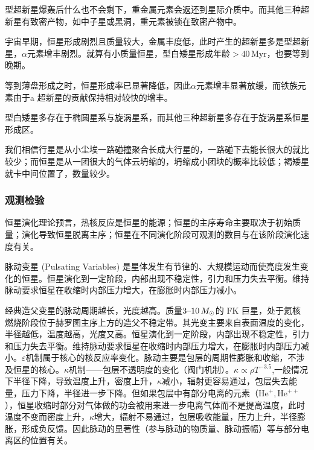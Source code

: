 \documentclass[../天体物理基础.tex]{subfiles}
\begin{document}
\uppercase\expandafter{}型超新星爆轰后什么也不会剩下，重金属元素会返还到星际介质中。而其他三种超新星有致密产物，如中子星或黑洞，重元素被锁在致密产物中。

宇宙早期，恒星形成剧烈且质量较大，金属丰度低，此时产生的超新星多是\uppercase\expandafter{}型超新星，$\alpha$元素增丰剧烈。就算有小质量恒星，\uppercase\expandafter{}型白矮星形成年龄$>40\,\mathrm{Myr}$，也要等到晚期。

等到薄盘形成之时，恒星形成率已显著降低，因此$\alpha$元素增丰显著放缓，而铁族元素由于\uppercase\expandafter{}a 超新星的贡献保持相对较快的增丰。

\uppercase\expandafter{}型白矮星多存在于椭圆星系与旋涡星系，而其他三种超新星多存在于旋涡星系恒星形成区。

我们相信行星是从小尘埃一路碰撞聚合长成大行星的，一路碰下去能长很大的就比较少；而恒星是从一团很大的气体云坍缩的，坍缩成小团块的概率比较低；褐矮星就卡中间位置了，数量较少。

\subsubsection{观测检验}
恒星演化理论预言，热核反应是恒星的能源；恒星的主序寿命主要取决于初始质量；演化导致恒星脱离主序；恒星在不同演化阶段可观测的数目与在该阶段演化速度有关。

脉动变星 (Pulsating Variables) 是星体发生有节律的、大规模运动而使亮度发生变化的恒星。恒星演化到一定阶段，内部出现不稳定性，引力和压力失去平衡。维持脉动要求恒星在收缩时内部压力增大，在膨胀时内部压力减小。

经典造父变星的脉动周期越长，光度越高。质量$3\text{\textendash}10\,M_{\odot}$的 F\text{\textendash}K 巨星，处于氦核燃烧阶段位于赫罗图主序上方的造父不稳定带。其光变主要来自表面温度的变化，半径越低，温度越高，光度又高。恒星演化到一定阶段，内部出现不稳定性，引力和压力失去平衡。维持脉动要求恒星在收缩时内部压力增大，在膨胀时内部压力减小。$\varepsilon$机制属于核心的核反应率变化。脉动主要是包层的周期性膨胀和收缩，不涉及恒星的核心。$\kappa$机制——包层不透明度的变化（阀门机制）。$\kappa\propto{}\rho{}T^{-3.5}$,一般情况下半径下降，导致温度上升，密度上升，$\kappa$减小，辐射更容易通过，包层失去能量，压力下降，半径进一步下降。但如果包层中有部分电离的元素（$\mathrm{He}^{+},\mathrm{He}^{++}$），恒星收缩时部分对气体做的功会被用来进一步电离气体而不是提高温度，此时温度不变而密度上升，$\kappa$增大，辐射不易通过，包层吸收能量，压力上升，半径膨胀，形成负反馈。因此脉动的显著性（参与脉动的物质量、脉动振幅）等与部分电离区的位置有关。
\end{document}
